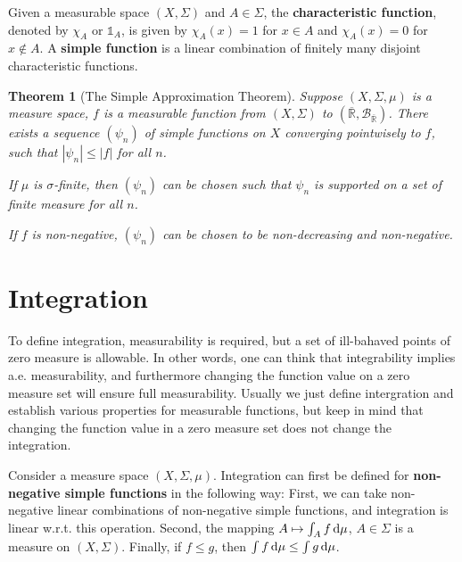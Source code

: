 \documentclass[openany]{book}
\newtheorem{theorem}{Theorem}[chapter]
\theoremstyle{definition}
\theoremstyle{remark}
\begin{document}
Given a measurable space $(X,\Sigma)$ and $A\in\Sigma$, the \textbf{characteristic function}, denoted by $\chi_A$ or $\mathds{1}_A$, is given by $\chi_A(x)=1$ for $x\in A$ and $\chi_A(x)=0$ for $x\not\in A$. A \textbf{simple function} is a linear combination of finitely many disjoint characteristic functions.
\begin{theorem}[The Simple Approximation Theorem]
    Suppose $(X,\Sigma,\mu)$ is a measure space, $f$ is a measurable function from $(X,\Sigma)$ to $(\overline{\mathbb{R}},\mathcal{B}_{\overline{\mathbb{R}}})$. There exists a sequence $(\psi_n)$ of simple functions on $X$ converging pointwisely to $f$, such that $|\psi_n|\le|f|$ for all $n$.

    If $\mu$ is $\sigma$-finite, then $(\psi_n)$ can be chosen such that $\psi_n$ is supported on a set of finite measure for all $n$.

    If $f$ is non-negative, $(\psi_n)$ can be chosen to be non-decreasing and non-negative.
\end{theorem}

\section{Integration}
To define integration, measurability is required, but a set of ill-bahaved points of zero measure is allowable. In other words, one can think that integrability implies a.e. measurability, and furthermore changing the function value on a zero measure set will ensure full measurability. Usually we just define intergration and establish various properties for measurable functions, but keep in mind that changing the function value in a zero measure set does not change the integration.

Consider a measure space $(X,\Sigma,\mu)$. Integration can first be defined for \textbf{non-negative simple functions} in the following way: First, we can take non-negative linear combinations of non-negative simple functions, and integration is linear w.r.t. this operation. Second, the mapping $A\mapsto\int_Af \dif\mu$, $A\in\Sigma$ is a measure on $(X,\Sigma)$. Finally, if $f\le g$, then $\int f \dif\mu\le\int g \dif\mu$.
\end{document}
